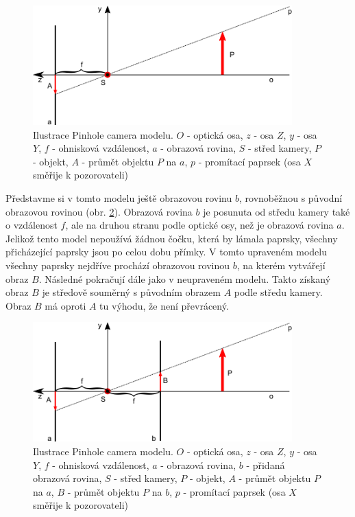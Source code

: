 \documentclass[11pt,twoside,a4paper]{book}
\begin{document}
\begin{figure}[h]
	\begin{center}
		\includegraphics[width=10cm]{ilustrace/Il-3-1}
		\caption{Ilustrace Pinhole camera modelu. $O$ - optická osa, $z$ - osa $Z$, $y$ - osa $Y$, $f$ - ohnisková vzdálenost, $a$ - obrazová rovina, $S$ - střed kamery, $P$ - objekt, $A$ - průmět objektu $P$ na $a$, $p$ - promítací paprsek  (osa $X$ směřije k pozorovateli)}
		\label{fig:cameraModelA}
	\end{center}
\end{figure}

Představme si v tomto modelu ještě obrazovou rovinu $b$, rovnoběžnou s původní obrazovou rovinou (obr. \ref{fig:cameraModelB}). Obrazová rovina $b$ je posunuta od středu kamery také o vzdálenost $f$, ale na druhou stranu podle optické osy, než je obrazová rovina $a$. Jelikož tento model nepoužívá žádnou čočku, která by lámala paprsky, všechny přicházející paprsky jsou po celou dobu přímky. V tomto upraveném modelu všechny paprsky nejdříve prochází obrazovou rovinou $b$, na kterém vytvářejí obraz $B$. Následné pokračují dále jako v neupraveném modelu. Takto získaný obraz $B$ je středově souměrný s původním obrazem $A$ podle středu kamery. Obraz $B$ má oproti $A$ tu výhodu, že není převrácený.


\begin{figure}[h]
	\begin{center}
		\includegraphics[width=10cm]{ilustrace/Il-4-1}
		\caption{Ilustrace Pinhole camera modelu. $O$ - optická osa, $z$ - osa $Z$, $y$ - osa $Y$, $f$ - ohnisková vzdálenost, $a$ - obrazová rovina, $b$ - přidaná obrazová rovina, $S$ - střed kamery, $P$ - objekt, $A$ - průmět objektu $P$ na $a$, $B$ - průmět objektu $P$ na $b$, $p$ - promítací paprsek  (osa $X$ směřije k pozorovateli)}
		\label{fig:cameraModelB}
	\end{center}
\end{figure}
\end{document}
